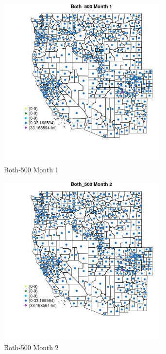 \begin{figure} 
\centering  
\includegraphics[width=0.77\textwidth]{Code_Outputs/df_report_ML_predictors_CountyCentroid_Locations_Dates_2008-01-01to2018-12-31_MapObsMo1Both_500.jpg} 
\caption{\label{fig:df_report_ML_predictors_CountyCentroid_Locations_Dates_2008-01-01to2018-12-31MapObsMo1Both_500}Both-500 Month 1} 
\end{figure} 
 

\begin{figure} 
\centering  
\includegraphics[width=0.77\textwidth]{Code_Outputs/df_report_ML_predictors_CountyCentroid_Locations_Dates_2008-01-01to2018-12-31_MapObsMo2Both_500.jpg} 
\caption{\label{fig:df_report_ML_predictors_CountyCentroid_Locations_Dates_2008-01-01to2018-12-31MapObsMo2Both_500}Both-500 Month 2} 
\end{figure} 
 

